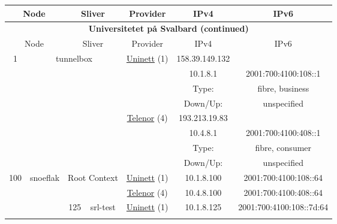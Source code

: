 \begin{small}
\begin{center}
\begin{longtable}{|c|c|c|c|c|c|c|c|}
 \multicolumn{2}{|p{8em}|}{Node} & \multicolumn{2}{|p{8em}|}{Sliver} & \multicolumn{2}{|p{8em}|}{Provider} & IPv4 & IPv6 \\ \hline
\endfirsthead
\hline
 \multicolumn{8}{|c|}{\textbf{Universitetet på Svalbard (continued)}} \\ \hline
 \multicolumn{2}{|p{8em}|}{Node} & \multicolumn{2}{|p{8em}|}{Sliver} & \multicolumn{2}{|p{8em}|}{Provider} & IPv4 & IPv6 \\ \hline
\endhead
 \multirow{8}{*}{\tiny{1}} & \multicolumn{3}{|c|}{\multirow{8}{*}{\tiny{tunnelbox}}} & \multicolumn{2}{|c|}{\multirow{4}{*}{\tiny{\href{https://www.uninett.no}{Uninett} (1)}}} & \tiny{158.39.149.132} & \frownie{} \\* \cline{7-7}\cline{8-8}
  & \multicolumn{3}{|c|}{} & \multicolumn{2}{|c|}{} & \tiny{10.1.8.1} & \tiny{2001:700:4100:108::1} \\* \cline{7-7}\cline{8-8}
  & \multicolumn{3}{|c|}{} & \multicolumn{2}{|c|}{} & Type: & fibre, business \\* \cline{7-7}\cline{8-8}
  & \multicolumn{3}{|c|}{} & \multicolumn{2}{|c|}{} & Down/Up:  & unspecified \\* \cline{5-5}\cline{6-6}\cline{7-7}\cline{8-8}
  & \multicolumn{3}{|c|}{} & \multicolumn{2}{|c|}{\multirow{4}{*}{\tiny{\href{https://www.telenor.no}{Telenor} (4)}}} & \tiny{193.213.19.83} & \frownie{} \\* \cline{7-7}\cline{8-8}
  & \multicolumn{3}{|c|}{} & \multicolumn{2}{|c|}{} & \tiny{10.4.8.1} & \tiny{2001:700:4100:408::1} \\* \cline{7-7}\cline{8-8}
  & \multicolumn{3}{|c|}{} & \multicolumn{2}{|c|}{} & Type: & fibre, consumer \\* \cline{7-7}\cline{8-8}
  & \multicolumn{3}{|c|}{} & \multicolumn{2}{|c|}{} & Down/Up:  & unspecified \\ \hline
 \multirow{20}{*}{\tiny{100}} & \multicolumn{1}{|l|}{\multirow{20}{*}{\tiny{snoeflak}}} & \multicolumn{2}{|c|}{\multirow{2}{*}{\tiny{Root Context}}} & \multicolumn{2}{|c|}{\tiny{\href{https://www.uninett.no}{Uninett} (1)}} & \tiny{10.1.8.100} & \tiny{2001:700:4100:108::64} \\* \cline{5-5}\cline{6-6}\cline{7-7}\cline{8-8}
  &  & \multicolumn{2}{|c|}{} & \multicolumn{2}{|c|}{\tiny{\href{https://www.telenor.no}{Telenor} (4)}} & \tiny{10.4.8.100} & \tiny{2001:700:4100:408::64} \\* \cline{3-3}\cline{4-4}\cline{5-5}\cline{6-6}\cline{7-7}\cline{8-8}
  &  & \multirow{2}{*}{\tiny{125}} & \multicolumn{1}{|l|}{\multirow{2}{*}{\tiny{srl-test}}} & \multicolumn{2}{|c|}{\tiny{\href{https://www.uninett.no}{Uninett} (1)}} & \tiny{10.1.8.125} & \tiny{2001:700:4100:108::7d:64} \\* \cline{5-5}\cline{6-6}\cline{7-7}\cline{8-8}

\end{longtable}
\end{center}
\end{small}
